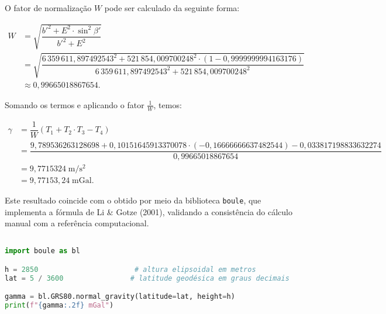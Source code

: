    





\noindent
O fator de normalização \(W\) pode ser calculado da seguinte forma:

\[
\begin{aligned}
   W &= \sqrt{\dfrac{b'^2 + E^2 \cdot \sin^2\beta'}{b'^2 + E^2}} \\
     &= \sqrt{\dfrac{6\,359\,611{,}897492543^2 + 521\,854{,}009700248^2 \cdot (1 - 0{,}9999999994163176)}{6\,359\,611{,}897492543^2 + 521\,854{,}009700248^2}} \\
     &\approx 0{,}99665018867654 \text{.}
\end{aligned}
\]


\noindent
Somando os termos e aplicando o fator \(\frac{1}{W}\), temos:

\[
\begin{aligned}
   \gamma &= \dfrac{1}{W} \left( T_1 + T_2 \cdot T_3 - T_4 \right) \\[6pt]
          &= \dfrac{ 9{,}789536263128698 + 0{,}10151645913370078 \cdot (-0{,}16666666637482544) - 0{,}033817198833632274}{0{,}99665018867654} \\
          &= 9{,}7715324\;\mathrm{m/s^2} \\
          &= 9{,}77153{,}24\;\mathrm{mGal} \text{.}
\end{aligned}
\]



\noindent
Este resultado coincide com o obtido por meio da biblioteca \texttt{boule}, que implementa a fórmula de Li \& Gotze (2001), validando a consistência do cálculo manual com a referência computacional.

\begin{lstlisting}[language=Python, caption={Cálculo da gravidade normal com a biblioteca \texttt{boule} 
para o modelo GRS80 (Valor obtido: 977153.24 mGal)}]

import boule as bl

h = 2850                       # altura elipsoidal em metros
lat = 5 / 3600                # latitude geodésica em graus decimais

gamma = bl.GRS80.normal_gravity(latitude=lat, height=h)
print(f"{gamma:.2f} mGal")
\end{lstlisting}


